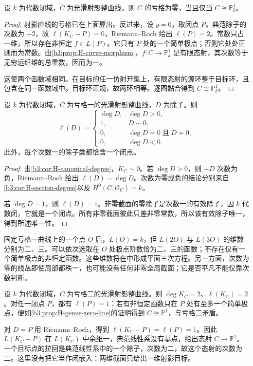 \begin{proposition}\label{b3:prop:H-genus-zero-line}
	设 \(k\) 为代数闭域，\(C\) 为光滑射影整曲线。则 \(C\) 的亏格为零，当且仅当 \(C\cong\mathbb P_k^1\)。
\end{proposition}
\begin{proof}
	射影直线的亏格已在上面算出。反过来，设 \(g=0\)，取闭点 \(P\)。典范除子的次数为 \(-2\)，故 \(\ell(K_C-P)=0\)，Riemann–Roch 给出 \(\ell(P)=2\)。常数只占一维，所以存在非恒定 \(f\in L(P)\)。它只有 \(P\) 处的一个简单极点；否则它处处正则而为常数。由\cref{b3:prop:H-curve-morphism}，\(f:C\rightarrow\mathbb P_k^1\) 是有限态射，其次数等于无穷远纤维的总重数，因而为一。

	这使两个函数域相同。在目标的任一仿射开集上，有限态射的源环整于目标环，且包含在同一函数域中。目标环正规，故两环相等。逐图黏合得到 \(C\cong\mathbb P_k^1\)。
\end{proof}

\begin{proposition}\label{b3:prop:H-genus-one-sections}
	设 \(k\) 为代数闭域，\(C\) 为亏格一的光滑射影整曲线，\(D\) 为除子。则
	\[
		\ell(D)=
		\begin{cases}
			\deg D,&\deg D>0,\\
			1,&D\sim0,\\
			0,&\deg D=0\;\text{且}\;D\not\sim0,\\
			0,&\deg D<0.
		\end{cases}
	\]
	此外，每个次数一的除子类都恰含一个闭点。
\end{proposition}
\begin{proof}
	由\cref{b3:cor:H-canonical-degree}，\(K_C\sim0\)。若 \(\deg D>0\)，则 \(-D\) 次数为负，Riemann–Roch 给出 \(\ell(D)=\deg D\)。次数为零或负的结论分别来自\cref{b3:cor:H-section-degree}以及 \(H^0(C,\mathcal O_C)=k\)。

	若 \(\deg D=1\)，则 \(\ell(D)=1\)。非零截面的零除子是次数一的有效除子，因 \(k\) 代数闭，它就是一个闭点。所有非零截面彼此只差非零常数，所以该有效除子唯一，得到所述唯一性。
\end{proof}

固定亏格一曲线上的一个点 \(O\) 后，\(L(O)=k\)，但 \(L(2O)\) 与 \(L(3O)\) 的维数分别为二、三。可以依次选取在 \(O\) 处极点阶数恰为二、三的函数；不存在仅有一个简单极点的非恒定函数。这些维数将在中形成平面三次方程。另一方面，次数为零的线丛即使局部都秩一，也可能没有任何非零全局截面；它是否平凡不能仅靠次数判断。

\begin{example}[亏格二的典范线性系]\label{b3:exm:H-genus-two-canonical}
	设 \(k\) 为代数闭域，\(C\) 为亏格二的光滑射影整曲线。则 \(\deg K_C=2\)、\(\ell(K_C)=2\)。对任一闭点 \(P\)，都有 \(\ell(P)=1\)：若有非恒定函数只在 \(P\) 处有至多一个简单极点，便如\cref{b3:prop:H-genus-zero-line}的证明得到 \(C\cong\mathbb P^1\)，与亏格二矛盾。

	\ProseParagraphBreak
	对 \(D=P\) 用 Riemann–Roch，得到 \(\ell(K_C-P)=\ell(P)=1\)。因此 \(L(K_C-P)\) 在 \(L(K_C)\) 中余维一，典范线性系没有基点，给出态射 \(C\rightarrow\mathbb P^1\)。一个目标点的拉回是典范线性系中的一个除子，次数为二，故这个态射的次数为二。这里没有把它当作闭嵌入：两维截面只给出一维射影目标。
\end{example}


